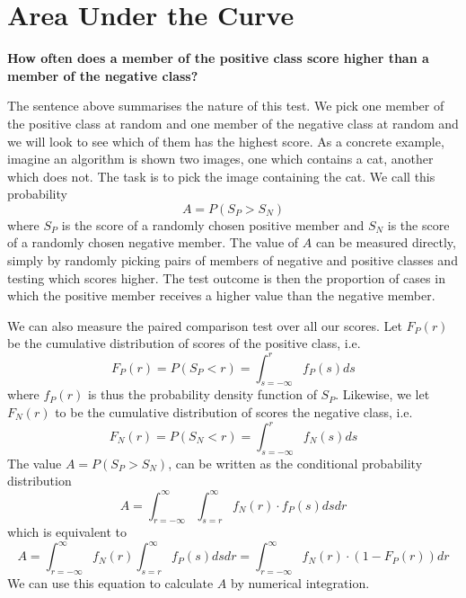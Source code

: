 \documentclass{article}
\begin{document}
\section{Area Under the Curve} 

{\bf How often does a member of the positive class score higher than a member of the negative class?} 

The sentence above summarises the nature of this test. We pick one member of the positive class at random and one member of the negative class at random and we will look to see which of them has the highest score. As a concrete example, imagine an algorithm is shown two images, one which contains a cat, another which does not. The task is to pick the image containing the cat. We call this probability 
\[
A = P(S_P>S_N)
\]
where $S_P$ is the score of a randomly chosen positive member and $S_N$ is the score of a randomly chosen negative member. The value of $A$ can be measured directly, simply by randomly picking pairs of members of negative and positive classes and testing which scores higher. The test outcome is then the proportion of cases in which the positive member receives a higher value than the negative member.

We can also measure the paired comparison test over all our scores. Let $F_P(r)$ be the cumulative distribution of scores of the positive class, i.e. 
\begin{equation}
F_P(r) = P(S_P < r) = \int_{s=-\infty}^{r} f_P(s) ds \label{eq:ScorefPr}
\end{equation}
where $f_P(r)$ is thus the probability density function of $S_P$. Likewise, we let $F_N(r)$ to be the cumulative distribution of scores the negative class, i.e. 
\begin{equation}
F_N(r) = P(S_N < r) = \int_{s=-\infty}^{r} f_N(s) ds \label{eq:ScorenPr}
\end{equation}
The value $A=P(S_P>S_N)$, can be written as the conditional probability distribution
\begin{equation}
A = \int_{r=-\infty}^{\infty} \int_{s=r}^{\infty}  f_N(r) \cdot  f_P(s) ds dr  \label{eq:SPgreaterSN}
\end{equation}
which is equivalent to
\begin{equation}
A = \int_{r=-\infty}^{\infty}  f_N(r)  \int_{s=r}^{\infty}  f_P(s) ds dr  = \int_{r=-\infty}^{\infty}  f_N(r) \cdot  \left(1 -  F_P(r) \right) dr \label{eq:SPgreaterSN2}
\end{equation}
We can use this equation to calculate $A$ by numerical integration. 
\end{document}
